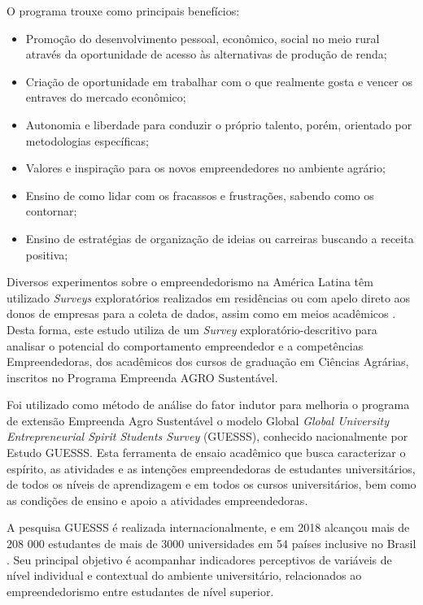 O programa trouxe como principais benefícios: 

\begin{itemize}
\item{Promoção do desenvolvimento pessoal, econômico, social no meio rural através da oportunidade de acesso às alternativas de produção de renda;}
\item{Criação de oportunidade em trabalhar com o que realmente gosta e vencer os entraves do mercado econômico;}
\item{Autonomia e liberdade para conduzir o próprio talento, porém, orientado por metodologias específicas;}
\item{Valores e inspiração para os novos empreendedores no ambiente agrário;}
\item{Ensino de como lidar com os fracassos e frustrações, sabendo como os contornar;}
\item{Ensino de estratégias de organização de ideias ou carreiras buscando a receita positiva;}
\end{itemize}



Diversos experimentos sobre o empreendedorismo na América Latina têm utilizado \textit{Surveys} exploratórios realizados em residências ou com apelo direto aos donos de empresas para a coleta de dados, assim como em meios acadêmicos \cite{lima_ser_2015}. Desta forma, este estudo utiliza de um \textit{Survey} exploratório-descritivo para analisar o potencial do comportamento empreendedor e a competências Empreendedoras, dos acadêmicos dos cursos de graduação em Ciências Agrárias, inscritos no Programa Empreenda AGRO Sustentável. 

Foi utilizado como método de análise do fator indutor para melhoria o programa de extensão Empreenda Agro Sustentável o modelo Global \textit{Global University Entrepreneurial Spirit Students Survey} (GUESSS), conhecido nacionalmente por Estudo GUESSS. Esta ferramenta de ensaio acadêmico que busca caracterizar o espírito, as atividades e as intenções empreendedoras de estudantes universitários, de todos os níveis de aprendizagem e em todos os cursos universitários, bem como as condições de ensino e apoio a atividades empreendedoras.


A pesquisa GUESSS é realizada internacionalmente, e em 2018 alcançou mais de 208 000 estudantes de mais de 3000 universidades em 54 países inclusive no Brasil \cite{sieger_global_2018}. Seu principal objetivo é acompanhar indicadores perceptivos de variáveis de nível individual e contextual do ambiente universitário, relacionados ao empreendedorismo entre estudantes de nível superior.

